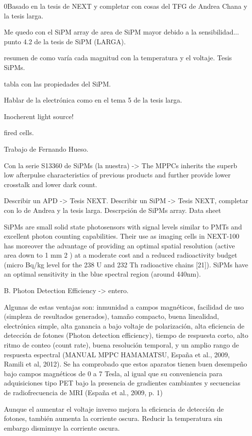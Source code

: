 0Basado en la tesis de NEXT y completar con cosas del TFG de Andrea Chana y la tesis larga.

Me quedo con el SiPM array de area de SiPM mayor debido a la sensibilidad... punto 4.2 de la tesis de SiPM (LARGA).

resumen de como varía cada magnitud con la temperatura y el voltaje. Tesis SiPMs.

tabla con las propiedades del SiPM.

Hablar de la electrónica como en el tema 5 de la tesis larga.

Inocherent light source!

fired cells.

Trabajo de Fernando Hueso.

Con la serie S13360 de SiPMs (la nuestra) -> The MPPCs inherits the superb low afterpulse characteristics of previous products and further provide lower crosstalk and lower dark count.

Describir un APD -> Tesis NEXT.
Describir un SiPM -> Tesis NEXT, completar con lo de Andrea y la tesis larga.
Descrpción de SiPMs array. Data sheet 

SiPMs are small solid state photosensors with signal levels similar to PMTs and excellent photon counting capabilities. Their use as imaging cells in NEXT-100 has moreover the advantage of providing an optimal spatial resolution (active area down to 1 mm 2 ) at a moderate cost and a reduced radioactivity budget (micro Bq/kg level for the 238 U and 232 Th radioactive chains [21]). SiPMs have an optimal sensitivity in the blue spectral region (around 440nm).

B. Photon Detection Efficiency -> entero.


Algunas de estas ventajas son: inmunidad a campos magnéticos, facilidad de uso (simpleza de resultados generados), tamaño compacto, buena linealidad, electrónica simple, alta ganancia a bajo voltaje de polarización, alta eficiencia de detección de fotones (Photon detection efficiency), tiempo de respuesta corto, alto ritmo de conteo (count rate), buena resolución temporal, y un amplio rango de respuesta espectral (MANUAL MPPC HAMAMATSU, España et al., 2009, Ramili et al, 2012). Se ha comprobado que estos aparatos tienen buen desempeño bajo campos magnéticos de 0 a 7 Tesla, al igual que su conveniencia para adquisiciones tipo PET bajo la presencia de gradientes cambiantes y secuencias de radiofrecuencia de MRI (España et al., 2009, p. 1)

Aunque el aumentar el voltaje inverso mejora la eficiencia de detección de fotones, también aumenta la corriente oscura. Reducir la temperatura sin embargo disminuye la corriente oscura.

